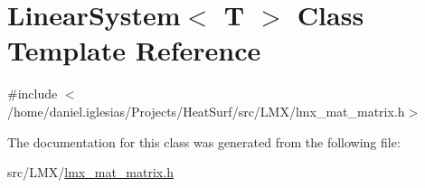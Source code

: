 \hypertarget{classLinearSystem}{\section{Linear\-System$<$ T $>$ Class Template Reference}
\label{classLinearSystem}
}


{\ttfamily \#include $<$/home/daniel.\-iglesias/\-Projects/\-Heat\-Surf/src/\-L\-M\-X/lmx\-\_\-mat\-\_\-matrix.\-h$>$}



The documentation for this class was generated from the following file\-:\begin{DoxyCompactItemize}
\item 
src/\-L\-M\-X/\hyperlink{lmx__mat__matrix_8h}{lmx\-\_\-mat\-\_\-matrix.\-h}\end{DoxyCompactItemize}
